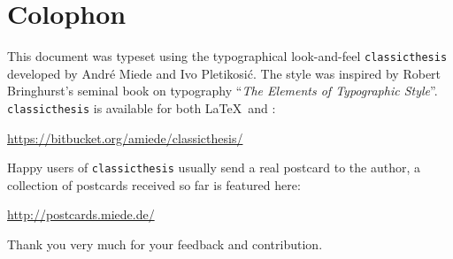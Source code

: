 \pagestyle{empty}

\hfill

\vfill


\section*{Colophon}
This document was typeset using the typographical look-and-feel \texttt{classicthesis} developed by Andr\'e Miede and Ivo Pletikosić.
The style was inspired by Robert Bringhurst's seminal book on typography \enquote{\emph{The Elements of Typographic Style}}.
\texttt{classicthesis} is available for both \LaTeX\ and \mLyX:
\begin{center}
\url{https://bitbucket.org/amiede/classicthesis/}
\end{center}
Happy users of \texttt{classicthesis} usually send a real postcard to the author, a collection of postcards received so far is featured here:
\begin{center}
\url{http://postcards.miede.de/}
\end{center}
Thank you very much for your feedback and contribution.

\bigskip

\noindent\finalVersionString


%
%
